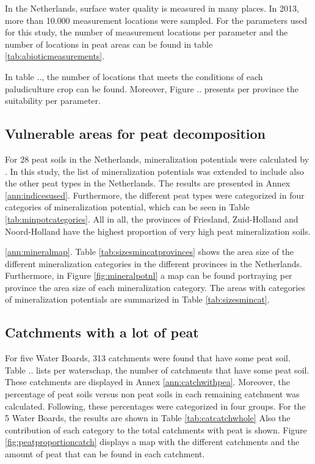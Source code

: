{In the Netherlands, surface water quality is measured in many places. In 2013, more than 10.000 measurement locations were sampled. For the parameters used for this study, the number of measurement locations per parameter and the number of locations in peat areas can be found in table \ref{tab:abioticmeasurements}.

In table .., the number of locations that meets the conditions of each paludiculture crop can be found. Moreover, Figure .. presents per province the suitability per parameter. 

\subsection{Vulnerable areas for peat decomposition}

For 28 peat soils in the Netherlands, mineralization potentials were calculated by \citep{stouthamer2008toelichting}.  In this study,  the list of mineralization potentials was extended to include also the other peat types in the Netherlands. The results are presented in Annex \ref{ann:indicesused}. Furthermore, the different peat types were categorized in four categories of mineralization potential, which can be seen in Table \ref{tab:minpotcategories}. 
All in all, the provinces of Friesland, Zuid-Holland and Noord-Holland have the highest proportion of very high peat mineralization soils.

\ref{ann:mineralmap}. Table \ref{tab:sizesmincatprovinces} shows the area size of the different mineralization categories in the different provinces in the Netherlands. Furthermore, in Figure \ref{fig:mineralpotnl} a map can be found portraying per province the area size of each mineralization category. The areas with categories of mineralization potentials are summarized in Table \ref{tab:sizesmincat}.

\subsection{Catchments with a lot of peat}

For five Water Boards, 313 catchments were found that have some peat soil. Table .. lists per waterschap, the number of catchments that have some peat soil. These catchments are displayed in Annex \ref{ann:catchwithpea}. Moreover, the percentage of peat soils versus non peat soils in each remaining catchment was calculated. Following, these percentages were categorized in four groups. For the 5 Water Boards, the results are shown in Table \ref{tab:catcatchwhole} Also the contribution of each category to the total catchments with peat is shown. Figure \ref{fig:peatproportioncatch} displays a map with the different catchments and the amount of peat that can be found in each catchment.

}
